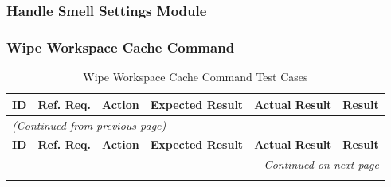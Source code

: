 \documentclass[12pt, titlepage]{article}
\begin{document}
\subsubsection{Handle Smell Settings Module}

\subsubsection{Wipe Workspace Cache Command}

\begin{longtable}{c
    >{\raggedright\arraybackslash}p{1.5cm}
    >{\raggedright\arraybackslash}p{4.5cm}
    >{\raggedright\arraybackslash}p{4cm}
  >{\raggedright\arraybackslash}p{3cm} c}
  \toprule
  \textbf{ID} & \textbf{Ref. Req.} & \textbf{Action} &
  \textbf{Expected Result} & \textbf{Actual Result} & \textbf{Result} \\
  \midrule
  \endfirsthead

  \multicolumn{6}{l}{\textit{(Continued from previous page)}} \\
  \toprule
  \textbf{ID} & \textbf{Ref. Req.} & \textbf{Action} &
  \textbf{Expected Result} & \textbf{Actual Result} & \textbf{Result} \\
  \midrule
  \endhead

  \multicolumn{6}{r}{\textit{Continued on next page}} \\
  \endfoot

  \bottomrule
  \caption{Wipe Workspace Cache Command Test Cases}
  \label{table:plugin_wipe_cache_tests}
  \endlastfoot


\end{longtable}
\end{document}
